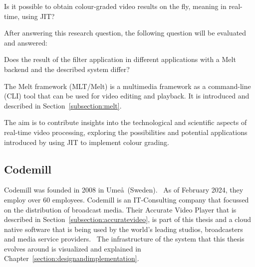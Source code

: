 \documentclass[../MasterThesis.tex]{subfiles}
\begin{document}
	\begin{researchbox}
		Is it possible to obtain colour-graded video results on the fly, meaning in real-time, using JIT?
	\end{researchbox}
	
	After answering this research question, the following question will be evaluated and answered:
	
	\begin{researchbox}
		Does the result of the filter application in different applications with a Melt backend and the described system differ? 
	\end{researchbox}

	The Melt framework (MLT/Melt) is a multimedia framework as a command-line (CLI) tool that can be used for video editing and playback. It is introduced and described in Section~\ref{subsection:melt}.


	
	The aim is to contribute insights into the technological and scientific aspects of real-time video processing, exploring the possibilities and potential applications introduced by using JIT to implement colour grading. 
	
	
	
	
	
	
	
	\subsection{Codemill} \label{subsection:codemill}
	
	Codemill was founded in 2008 in Ume\aa \ (Sweden).~\cite{codemill_now, codemill_old, codemill_linkedin}
	As of February 2024, they employ over 60 employees. \cite{codemill} 
	Codemill is an IT-Consulting company that focussed on the distribution of broadcast media. Their Accurate Video Player that is described in Section~\ref{subsection:accuratevideo}, is part of this thesis and a cloud native software that is being used by the world's leading studios, broadcasters and media service providers.~\cite{codemill_linkedin, codemill_avp}
	The infrastructure of the system that this thesis evolves around is visualized and explained in Chapter~\ref{section:designandimplementation}.
	
\end{document}
